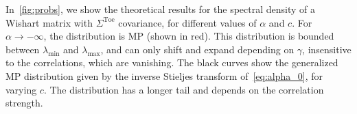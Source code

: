 \documentclass{article}
\begin{document}
In~\cref{fig:probs}, we show the theoretical results for the spectral density of a Wishart matrix with $\Sigma^\mathrm{Toe}$ covariance, for different values of $\alpha$ and $c$. For $\alpha \to -\infty$, the distribution is MP (shown in red). This distribution is bounded between $\lambda_\mathrm{min}$ and $\lambda_\mathrm{max}$, and can only shift and expand depending on $\gamma$, insensitive to the correlations, which are vanishing. The black curves show the generalized MP distribution given by the inverse Stieljes transform of~\cref{eq:alpha_0}, for varying $c$. The distribution has a longer tail and depends on the correlation strength.
\end{document}
